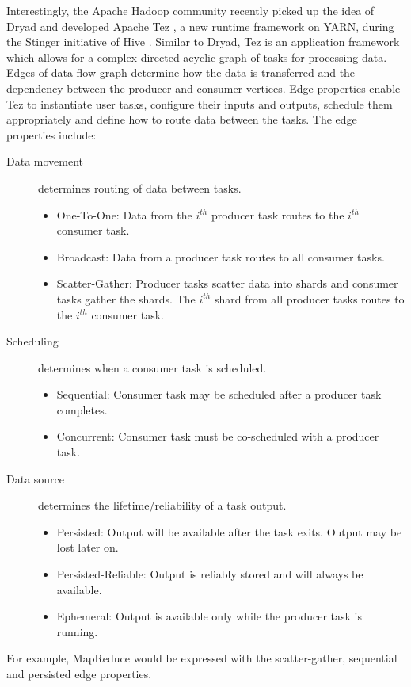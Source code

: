 \documentclass[12pt]{book}
\begin{document}
Interestingly, the Apache Hadoop community recently picked up the idea of Dryad and developed Apache Tez \cite{Tez, TezTutorial}, a new runtime framework on YARN, during the Stinger initiative of Hive \cite{Stinger}. Similar to Dryad, Tez is an application framework which allows for a complex directed-acyclic-graph of tasks for processing data. Edges of data flow graph determine how the data is transferred and the dependency between the producer and consumer vertices. Edge properties enable Tez to instantiate user tasks, configure their inputs and outputs, schedule them appropriately and define how to route data between the tasks. The edge properties include:
\begin{description}
\item[Data movement] determines routing of data between tasks.
\begin{itemize}
\item One-To-One: Data from the $i^{th}$ producer task routes to the $i^{th}$ consumer task.
\item Broadcast: Data from a producer task routes to all consumer tasks.
\item Scatter-Gather: Producer tasks scatter data into shards and consumer tasks gather the shards. The $i^{th}$ shard from all producer tasks routes to the $i^{th}$ consumer task.
\end{itemize}
\item[Scheduling] determines when a consumer task is scheduled.
\begin{itemize}
\item Sequential: Consumer task may be scheduled after a producer task completes.
\item Concurrent: Consumer task must be co-scheduled with a producer task.
\end{itemize}
\item[Data source] determines the lifetime/reliability of a task output.
\begin{itemize}
\item Persisted: Output will be available after the task exits. Output may be lost later on.
\item Persisted-Reliable: Output is reliably stored and will always be available.
\item Ephemeral: Output is available only while the producer task is running.
\end{itemize}
\end{description}
For example, MapReduce would be expressed with the scatter-gather, sequential and persisted edge properties. 
\end{document}
